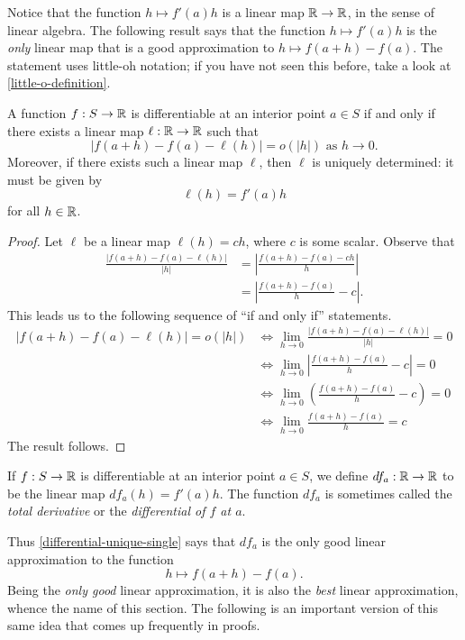 Notice that the function $h \mapsto f'(a)h$ is a linear map $\mathbb{R} \to \mathbb{R}$, in the sense of linear algebra. The following result says that the function $h \mapsto f'(a)h$ is the \emph{only} linear map that is a good approximation to $h \mapsto f(a+h)-f(a)$. The statement uses little-oh notation; if you have not seen this before, take a look at \cref{little-o-definition}.

\begin{proposition} \label{differential-unique-single}
	A function $f : S \to \mathbb{R}$ is differentiable at an interior point $a \in S$ if and only if there exists a linear map $\ell : \mathbb{R} \to \mathbb{R}$ such that
	\[ |f(a+h)-f(a) - \ell(h)| = o(|h|) \text{ as } h \to 0. \]
	Moreover, if there exists such a linear map $\ell$, then $\ell$ is uniquely determined: it must be given by \[ \ell(h) = f'(a)h \]
	for all $h \in \mathbb{R}$. 
\end{proposition}

\begin{proof}
	Let $\ell$ be a linear map $\ell(h) = ch$, where $c$ is some scalar. Observe that
	\[ \begin{aligned} \frac{|f(a+h)-f(a)-\ell(h)|}{|h|} &= \left| \frac{f(a+h)-f(a) - ch}{h} \right| \\
	&= \left| \frac{f(a+h)-f(a)}{h} - c \right|. \end{aligned} \]
	This leads us to the following sequence of ``if and only if'' statements. 
	\[ \begin{aligned} |f(a+h)-f(a)-\ell(h)| = o(|h|) &\iff \lim_{h \to 0} \frac{|f(a+h)-f(a)-\ell(h)|}{|h|} = 0 \\
	&\iff \lim_{h \to 0} \left| \frac{f(a+h)-f(a)}{h} - c \right| = 0 \\
	&\iff \lim_{h \to 0} \left( \frac{f(a+h)-f(a)}{h} - c \right) = 0 \\
	&\iff \lim_{h \to 0} \frac{f(a+h)-f(a)}{h} = c \end{aligned} \]
	The result follows. 
\end{proof}

\begin{definition}
	If $f : S \to \mathbb{R}$ is differentiable at an interior point $a \in S$, we define $df_a : \mathbb{R} \to \mathbb{R}$ to be the linear map $df_a(h) = f'(a)h$. The function $df_a$ is sometimes called the \emph{total derivative} or the \emph{differential of $f$ at $a$}. 
\end{definition}

Thus \cref{differential-unique-single} says that $df_a$ is the only good linear approximation to the function \[ h \mapsto f(a+h)-f(a). \] Being the \emph{only good} linear approximation, it is also the \emph{best} linear approximation, whence the name of this section. The following is an important version of this same idea that comes up frequently in proofs. 

